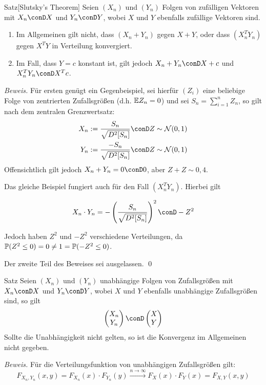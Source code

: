 \begin{colbox}{Satz}[Slutsky's Theorem]
    Seien $(X_n)$ und $(Y_n)$ Folgen von zufälligen Vektoren mit $X_n\conD X$ und $Y_n\conD Y$, wobei $X$ und $Y$ 
    ebenfalls zufällige Vektoren sind. 
    \begin{enumerate}
        \item Im Allgemeinen gilt nicht, dass $(X_n+Y_n)$ gegen $X+Y$, oder dass $(X_n^TY_n)$ gegen $X^TY$ 
        in Verteilung konvergiert. 
        \item Im Fall, dass $Y=c$ konstant ist, gilt jedoch $X_n+Y_n\conD X+c$ und $X_n^TY_n \conD X^Tc$.
    \end{enumerate} 
\end{colbox}
\textit{Beweis.}
Für ersten genügt ein Gegenbeispiel, sei hierfür $(Z_i)$ eine beliebige Folge von zentrierten Zufallsgrößen 
(d.h. $\E Z_n = 0$) und sei $S_n = \sum_{i=1}^{n} Z_n$, so gilt nach dem zentralen Grenzwertsatz:
\begin{align*}
    X_n := \dfrac{S_n}{\sqrt{D^2[S_n]}} \conD Z\sim \mathcal{N}(0,1) \\
    Y_n := \dfrac{-S_n}{\sqrt{D^2[S_n]}} \conD Z\sim \mathcal{N}(0,1)
\end{align*}
Offensichtlich gilt jedoch $X_n+Y_n=0\conD 0$, aber $Z+Z\sim \mathcal{0,4}$. 

Das gleiche Beispiel fungiert auch für den Fall $(X_n^TY_n)$. Hierbei gilt 

\[
    X_n\cdot Y_n = -\left(\dfrac{S_n}{\sqrt{D^2[S_n]}}\right)^2 \conD -Z^2
\]

Jedoch haben $Z^2$ und $-Z^2$ verschiedene Verteilungen, da $\P(Z^2\leq 0) = 0 \neq 1 = \P(-Z^2\leq 0)$.

Der zweite Teil des Beweises sei ausgelassen.
\qed

\begin{colbox}{Satz}
    Seien $(X_n)$ und $(Y_n)$ unabhängige Folgen von Zufallsgrößen mit $X_n\conD X$ und $Y_n\conD Y$, wobei $X$ und $Y$ 
    ebenfalls unabhängige Zufallsgrößen sind, so gilt 
    \[
        \begin{pmatrix}
            X_n \\ Y_n 
        \end{pmatrix} 
        \conD 
        \begin{pmatrix}
            X \\ Y 
        \end{pmatrix}
    \]
    Sollte die Unabhängigkeit nicht gelten, so ist die Konvergenz im Allgemeinen nicht gegeben.
\end{colbox}
\textit{Beweis.}
Für die Verteilungsfunktion von unabhängigen Zufallsgrößen gilt:
\[
    F_{X_n,Y_n}(x,y) = F_{X_n}(x)\cdot F_{Y_n}(y) \xrightarrow{n\to\infty} F_X(x)\cdot F_Y(x) = F_{X,Y}(x,y)
\]

